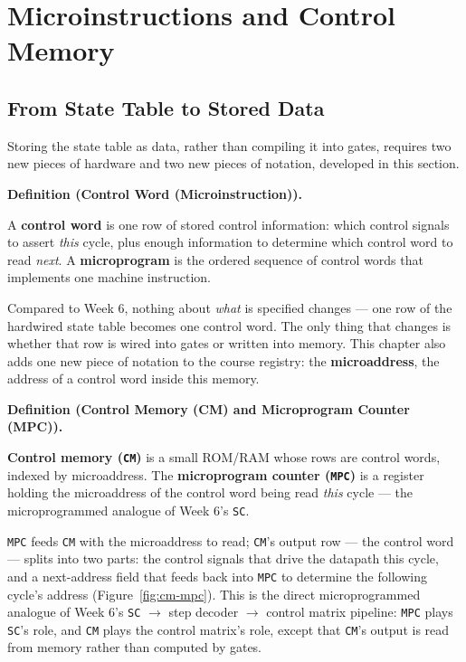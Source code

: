 \documentclass[11pt]{article}
\newenvironment{definitionbox}[1]{%
  \par\noindent\textbf{Definition (#1).}\ \itshape
}{\par\vspace{0.3em}}
\begin{document}
\section{Microinstructions and Control Memory}
\label{sec:cm}

\subsection{From State Table to Stored Data}

Storing the state table as data, rather than compiling it into gates, requires two new pieces of hardware and two new pieces of notation, developed in this section.

\begin{definitionbox}{Control Word (Microinstruction)}
A \textbf{control word} is one row of stored control information: which control signals to assert \emph{this} cycle, plus enough information to determine which control word to read \emph{next}. A \textbf{microprogram} is the ordered sequence of control words that implements one machine instruction.
\end{definitionbox}

Compared to Week 6, nothing about \emph{what} is specified changes --- one row of the hardwired state table becomes one control word. The only thing that changes is whether that row is wired into gates or written into memory. This chapter also adds one new piece of notation to the course registry: the \textbf{microaddress}, the address of a control word inside this memory.

\begin{definitionbox}{Control Memory (CM) and Microprogram Counter (MPC)}
\textbf{Control memory (\texttt{CM})} is a small ROM/RAM whose rows are control words, indexed by microaddress. The \textbf{microprogram counter (\texttt{MPC})} is a register holding the microaddress of the control word being read \emph{this} cycle --- the microprogrammed analogue of Week 6's \texttt{SC}.
\end{definitionbox}

\texttt{MPC} feeds \texttt{CM} with the microaddress to read; \texttt{CM}'s output row --- the control word --- splits into two parts: the control signals that drive the datapath this cycle, and a next-address field that feeds back into \texttt{MPC} to determine the following cycle's address (Figure~\ref{fig:cm-mpc}). This is the direct microprogrammed analogue of Week 6's \texttt{SC} $\to$ step decoder $\to$ control matrix pipeline: \texttt{MPC} plays \texttt{SC}'s role, and \texttt{CM} plays the control matrix's role, except that \texttt{CM}'s output is read from memory rather than computed by gates.
\end{document}
